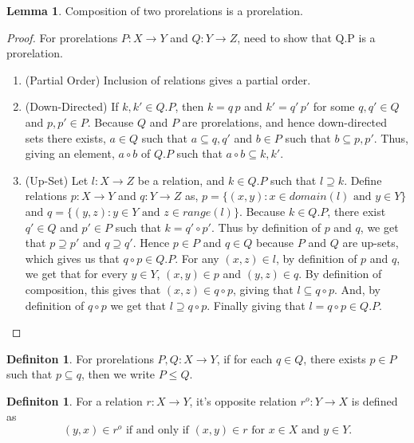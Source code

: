 \documentclass[18pt,a4paper]{article}
\theoremstyle{definition}
\newtheorem{definition}[theorem]{Definiton}
\newtheorem{lemma}[theorem]{Lemma}
\begin{document}
		\begin{lemma}
			Composition of two prorelations is a prorelation.
		\end{lemma}
		\begin{proof}\setcounter{equation}{0}

			For prorelations $P:X \to Y$ and $Q:Y \to Z$, need to show that Q.P is a prorelation.
			\begin{enumerate}[label=(\roman*)]
				\item (Partial Order) Inclusion of relations gives a partial order.
				\item (Down-Directed) If $k,k' \in Q.P$, then $k=q\,p$ and $k'=q'\,p'$ for some
					$q,q' \in Q$ and $p,p' \in P$. Because $Q$ and $P$ are prorelations,
					and hence down-directed sets there exists, $a \in Q$ such that
					$ a\subseteq q,q'$ and $b \in P$ such that $b \subseteq p,p'$. Thus,
					giving an element, $a\circ b$ of $Q.P$ such that $a \circ b \subseteq k, k'$.
				\item (Up-Set) Let $l:X \to Z$ be a relation, and $k \in Q.P$ such that $l \supseteq k$.
					Define relations $ p:X \to Y $ and $q:Y \to Z$ as,
					$p=\{(x,y): x \in domain(l) \text{ and } y \in Y\}$ and
					$q=\{(y,z):  y \in Y \text{ and } z \in range(l)\}$.
					Because $k\in Q.P$, there exist $q'\in Q$ and $p' \in P$ such that
					$k = q' \circ p'$. Thus by definition of $p$ and $q$, we get that
					$p \supseteq p'$ and $q \supseteq q'$. Hence $p \in P$ and $q \in Q$ because
					$P$ and $Q$ are up-sets, which gives us that $q\circ p \in Q.P$.
					For any $(x,z) \in l$, by definition
					of $p$ and $q$, we get that for every $y \in Y$, $(x,y) \in p$ and
					$(y,z) \in q $. By
					definition of composition, this gives that $(x,z) \in q \circ p$,
					giving that $l \subseteq q \circ p$. And, by definition
					of $q \circ p$ we get that $l \supseteq q \circ p$. Finally giving that
					$l=q \circ p \in Q.P$. \qedhere
			\end{enumerate}
		\end{proof}
		\begin{definition} %

			For prorelations $P,Q:X\to Y$, if for each $q \in Q$, there exists $p \in P$ such that
			$p \subseteq q$, then we write $P\leq Q$.
		\end{definition}
		\begin{definition} %
			For a relation $r:X \to Y$, it's opposite relation $r^o:Y \to X$ is defined as
			\[ (y,x) \in r^o \text{ if and only if } (x,y)\in r  \text{ for } x\in X \text{ and }
			y \in Y.\]
		\end{definition}
\end{document}
